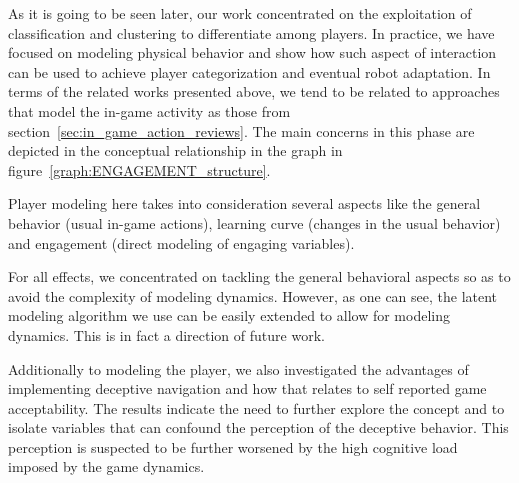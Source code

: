 As it is going to be seen later, our work concentrated on the exploitation of classification and clustering to differentiate among players. In practice, we have focused on modeling physical behavior and show how such aspect of interaction can be used to achieve player categorization and eventual robot adaptation. In terms of the related works presented above, we tend to be related to approaches that model the in-game activity as those from section~\ref{sec:in_game_action_reviews}. The main concerns in this phase are depicted in the conceptual relationship in the graph in figure~\ref{graph:ENGAGEMENT_structure}.



Player modeling here takes into consideration several aspects like the general behavior (usual in-game actions), learning curve (changes in the usual behavior) and engagement (direct modeling of engaging variables). 

For all effects, we concentrated on tackling the general behavioral aspects so as to avoid the complexity of modeling dynamics. However, as one can see, the latent modeling algorithm we use can be easily extended to allow for modeling dynamics. This is in fact a direction of future work.

Additionally to modeling the player, we also investigated the advantages of implementing deceptive navigation and how that relates to self reported game acceptability. The results indicate the need to further explore the concept and to isolate variables that can confound the perception of the deceptive behavior. This perception is suspected to be further worsened by the high cognitive load imposed by the game dynamics.